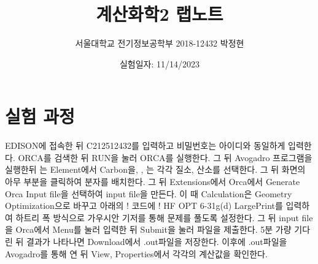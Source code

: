 \documentclass[%
 reprint,
 amsmath,amssymb,
 aps,
]{revtex4-2}
\begin{document}
\title{계산화학2 랩노트}

\author{서울대학교 전기정보공학부 2018-12432 박정현}
\date{실험일자: 11/14/2023}%

\maketitle

\section{\label{sec:level1}실험 과정}
EDISON에 접속한 뒤 C212512432를 입력하고 비밀번호는 아이디와 동일하게 입력한다. ORCA를 검색한 뒤 RUN을 눌러 ORCA를 실행한다. 그 뒤 Avogadro 프로그램을 실행한뒤 는 Element에서 Carbon을, , 는 각각 질소, 산소를 선택한다. 그 뒤 화면의 아무 부분을 클릭하여 분자를 배치한다. 그 뒤 Extensions에서 Orca에서 Generate Orca Input file을 선택하여 input file을 만든다. 이 때 Calculation은 Geometry Optimization으로 바꾸고 아래의 ! 코드에 ! HF OPT 6-31g(d) LargePrint를 입력하여 하트리 폭 방식으로 가우시안 기저를 통해 문제를 풀도록 설정한다. 그 뒤 input file을 Orca에서 Menu를 눌러 입력한 뒤 Submit을 눌러 파일을 제출한다. 5분 가량 기다린 뒤 결과가 나타나면 Download에서 .out파일을 저장한다. 이후에 .out파일을 Avogadro를 통해 연 뒤 View, Properties에서 각각의 계산값을 확인한다.
\end{document}
